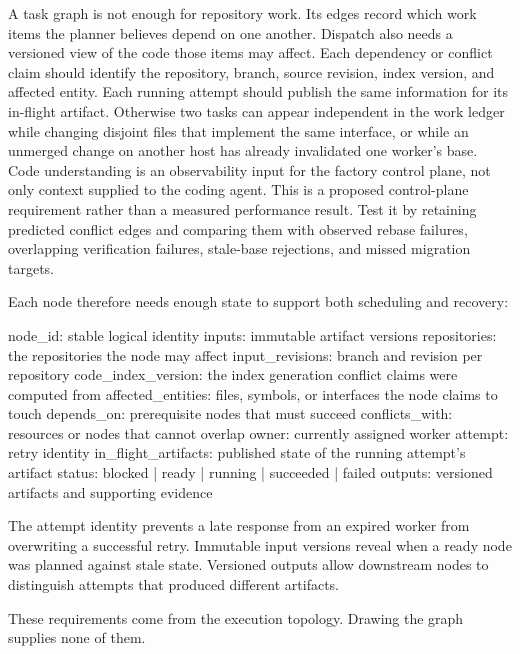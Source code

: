 A task graph is not enough for repository work. Its edges record which work items the planner believes depend on one another. Dispatch also needs a versioned view of the code those items may affect. Each dependency or conflict claim should identify the repository, branch, source revision, index version, and affected entity. Each running attempt should publish the same information for its in-flight artifact. Otherwise two tasks can appear independent in the work ledger while changing disjoint files that implement the same interface, or while an unmerged change on another host has already invalidated one worker's base. Code understanding is an observability input for the factory control plane, not only context supplied to the coding agent. This is a proposed control-plane requirement rather than a measured performance result. Test it by retaining predicted conflict edges and comparing them with observed rebase failures, overlapping verification failures, stale-base rejections, and missed migration targets.

Each node therefore needs enough state to support both scheduling and recovery:

\begin{record}
\begin{recordbody}
node_id: stable logical identity
inputs: immutable artifact versions
repositories: the repositories the node may affect
input_revisions: branch and revision per repository
code_index_version: the index generation conflict claims were computed from
affected_entities: files, symbols, or interfaces the node claims to touch
depends_on: prerequisite nodes that must succeed
conflicts_with: resources or nodes that cannot overlap
owner: currently assigned worker
attempt: retry identity
in_flight_artifacts: published state of the running attempt's artifact
status: blocked | ready | running | succeeded | failed
outputs: versioned artifacts and supporting evidence
\end{recordbody}
\end{record}

The attempt identity prevents a late response from an expired worker from overwriting a successful retry. Immutable input versions reveal when a ready node was planned against stale state. Versioned outputs allow downstream nodes to distinguish attempts that produced different artifacts.

These requirements come from the execution topology. Drawing the graph supplies none of them.

